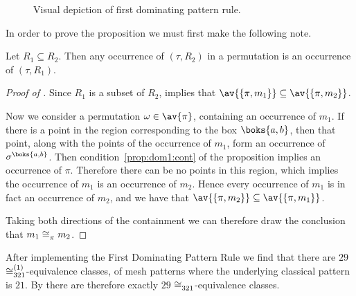 \begin{figure}[htb]
    \begin{center}
        \raisebox{2ex}{\(\mapsto\)}

        \caption{Visual depiction of first dominating pattern rule.}
        \label{fig:rule1}
    \end{center}
\end{figure}

In order to prove the proposition we must first make the following note.

\begin{note}
    \label{not:downcmesh}
    Let \(R_1 \subseteq R_2\). Then any occurrence of \((\tau, R_2)\) in a permutation
    is an occurrence of \((\tau,R_1)\).
\end{note}

\begin{proof}[Proof of ]
    Since \(R_1\) is a subset of \(R_2\),  implies that
    \(\av{\{\pi,m_1\}} \subseteq \av{\{\pi,m_2\}}\).

    Now we consider a permutation \(\omega \in \av{\pi}\), containing an
    occurrence of \(m_1\). If there is a point in the region corresponding to
    the box \(\boks{a,b}\), then that point, along with the points of the
    occurrence of \(m_1\), form an occurrence of \(\sigma^\boks{a,b}\). Then
    condition~\eqref{prop:dom1:cont} of the proposition implies an occurrence of
    \(\pi\). Therefore there can be no points in this region, which implies the
    occurrence of \(m_1\) is an occurrence of \(m_2\). Hence every occurrence of
    \(m_1\) is in fact an occurrence of \(m_2\), and we have that
    \(\av{\{\pi,m_2\}} \subseteq \av{\{\pi,m_1\}}\).

    Taking both directions of the containment we can therefore draw the
    conclusion that \(m_1 \coinc{\pi} m_2\).
\end{proof}

After implementing the First Dominating Pattern Rule we find that there are
\(29\) \(\coinc[(1)]{321}\)-equivalence classes, of mesh patterns where the
underlying classical pattern is \(21\). By  there are
therefore exactly \(29\) \(\coinc{321}\)-equivalence classes.

